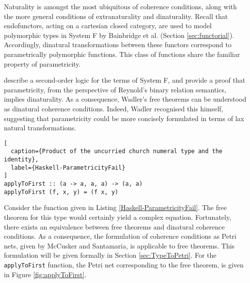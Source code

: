 \documentclass[../../Reflection.tex]{subfiles}
\begin{document}
\par
Naturality is amongst the most ubiquitous of coherence conditions, along with the more general conditions of extranaturality and dinaturality. Recall that endofunctors, acting on a cartesian closed category, are used to model polymorphic types in System F by Bainbridge et al. (Section \ref{sec:functorial}). Accordingly, dinatural transformations between these functors correspond to parametrically polymorphic functions. This class of functions share the familiar property of parametricity.
\par
{} describe a second-order logic for the terms of System F, and provide a proof that parametricity, from the perspective of Reynold's binary relation semantics, implies dinaturality. As a consequence, Wadler's free theorems can be understood as dinatural coherence conditions. Indeed, Wadler recognised this himself, suggesting that parametricity could be more concisely formulated in terms of lax natural transformations.
\begin{lstlisting}[
  caption={Product of the uncurried church numeral type and the identity},
  label={Haskell-ParametricityFail}
]
applyToFirst :: (a -> a, a, a) -> (a, a)
applyToFirst (f, x, y) = (f x, y)
\end{lstlisting}
Consider the function given in Listing \ref{Haskell-ParametricityFail}. The free theorem for this type would certainly yield a complex equation. Fortunately, there exists an equivalence between free theorems and dinatural coherence conditions. As a consequence, the formulation of coherence conditions as Petri nets, given by McCusker and Santamaria, is applicable to free theorems. This formulation will be given  formally in Section \ref{sec:TypeToPetri}. For the \lstinline{applyToFirst} function, the Petri net corresponding to the free theorem, is given in Figure \ref{fig:applyToFirst}.
\end{document}
